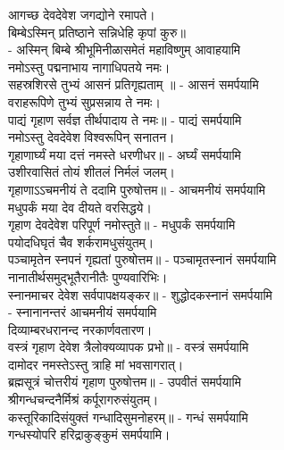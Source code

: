 आगच्छ देवदेवेश जगद्योने रमापते।\\
बिम्बेऽस्मिन् प्रतिष्ठाने सन्निधेहि कृपां कुरु॥\\
- अस्मिन् बिम्बे श्रीभूमिनीळासमेतं महाविष्णुम् आवाहयामि\\

नमोऽस्तु पद्मनाभाय नागाधिपतये नमः।\\
सहस्रशिरसे तुभ्यं आसनं प्रतिगृह्यताम् ॥ - आसनं समर्पयामि\\

वराहरूपिणे तुभ्यं सुप्रसन्नाय ते नमः।\\
पाद्यं गृहाण सर्वज्ञ तीर्थपादाय ते नमः॥ - पाद्यं समर्पयामि\\
 
नमोऽस्तु देवदेवेश विश्वरूपिन् सनातन।\\
गृहाणार्घ्यं मया दत्तं नमस्ते धरणीधर॥ - अर्घ्यं समर्पयामि\\

उशीरवासितं तोयं शीतलं निर्मलं जलम्।\\
गृहाणाऽऽचमनीयं ते ददामि पुरुषोत्तम॥ - आचमनीयं समर्पयामि\\

मधुपर्कं मया देव दीयते वरसिद्धये।\\
गृहाण देवदेवेश परिपूर्ण नमोस्तुते॥ - मधुपर्कं समर्पयामि\\

पयोदधिघृतं चैव शर्करामधुसंयुतम्।\\
पञ्चामृतेन स्नपनं गृह्यतां पुरुषोत्तम॥ - पञ्चामृतस्नानं समर्पयामि\\

नानातीर्थसमुद्भूतैरानीतैः पुण्यवारिभिः। \\
स्नानमाचर देवेश सर्वपापक्षयङ्कर॥ - शुद्धोदकस्नानं समर्पयामि\\
- स्नानानन्तरं आचमनीयं समर्पयामि\\

दिव्याम्बरधरानन्द नरकार्णवतारण।\\
वस्त्रं गृहाण देवेश त्रैलोक्यव्यापक प्रभो॥ - वस्त्रं समर्पयामि\\

दामोदर नमस्तेऽस्तु त्राहि मां भवसागरात्।\\
ब्रह्मसूत्रं चोत्तरीयं गृहाण पुरुषोत्तम॥ - उपवीतं समर्पयामि\\

श्रीगन्धचन्दनैर्मिश्रं कर्पूरागरुसंयुतम्। \\
कस्तूरिकादिसंयुक्तं गन्धादिसुमनोहरम्॥ - गन्धं समर्पयामि\\
गन्धस्योपरि हरिद्राकुङ्कुमं समर्पयामि।\\

